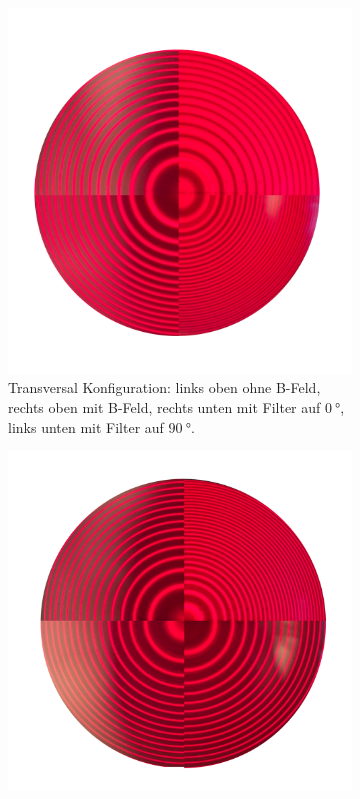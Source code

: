 \begin{figure}[h]
    \centering
    \begin{subfigure}{0.45\linewidth}
        \centering
        \includegraphics[width=\linewidth]{../figs/transversal_konfig}
        \caption{Transversal Konfiguration: links oben ohne B-Feld, rechts oben mit B-Feld,
            rechts unten mit Filter auf $\SI{0}{\degree}$, links unten mit Filter auf $\SI{90}{\degree}$.}
        \label{fig:transversal_konfiguration}
    \end{subfigure}
    \hspace{.5cm}
    \begin{subfigure}{0.45\linewidth}
        \centering
        \includegraphics[width=\linewidth]{../figs/longitudinal_konfig}

\end{subfigure}
\end{figure}
